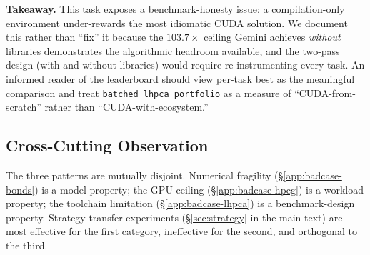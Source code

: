 \documentclass{article}
\begin{document}
\textbf{Takeaway.} This task exposes a benchmark-honesty issue: a
compilation-only environment under-rewards the most idiomatic CUDA
solution. We document this rather than ``fix'' it because the
$103.7\times$ ceiling Gemini achieves \emph{without} libraries
demonstrates the algorithmic headroom available, and the
two-pass design (with and without libraries) would require
re-instrumenting every task. An informed reader of the leaderboard
should view per-task best as the meaningful comparison and treat
\texttt{batched\_lhpca\_portfolio} as a measure of
``CUDA-from-scratch'' rather than ``CUDA-with-ecosystem.''

\subsection{Cross-Cutting Observation}

The three patterns are mutually disjoint. Numerical fragility
(\S\ref{app:badcase-bonds}) is a model property; the GPU ceiling
(\S\ref{app:badcase-hpcg}) is a workload property; the toolchain
limitation (\S\ref{app:badcase-lhpca}) is a benchmark-design property.
Strategy-transfer experiments
(\S\ref{sec:strategy} in the main text) are most effective for the
first category, ineffective for the second, and orthogonal to the
third.


\newpage

\end{document}
